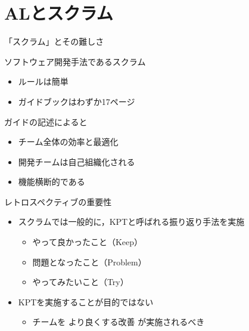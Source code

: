 \documentclass[uplatex,dvipdfmx,14pt,presentation,t]{beamer}
\begin{document}
\section{ALとスクラム}
\label{sec-2}
\begin{frame}[label=sec-2-1]{「スクラム」とその難しさ}
\begin{block}{ソフトウェア開発手法であるスクラム}
\begin{itemize}
\item ルールは簡単
\item ガイドブックはわずか17ページ
\end{itemize}
\pause
\end{block}
\begin{block}{ガイドの記述によると}
\begin{itemize}
\item チーム全体の効率と最適化
\item 開発チームは自己組織化される
\item 機能横断的である
\end{itemize}
\end{block}
\end{frame}

\begin{frame}[label=sec-2-2]{レトロスペクティブの重要性}
\begin{itemize}
\item スクラムでは一般的に，KPTと呼ばれる振り返り手法を実施
\begin{itemize}
\item やって良かったこと（Keep）
\item 問題となったこと（Problem）
\item やってみたいこと（Try）
\end{itemize}
\end{itemize}
\pause
\begin{itemize}
\item KPTを実施することが目的ではない
\begin{itemize}
\item チームを \alert{より良くする改善} が実施されるべき
\end{itemize}
\end{itemize}
\end{frame}
\end{document}
